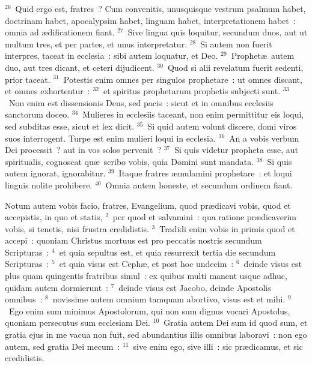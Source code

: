 ${}^{26}$~Quid ergo est, fratres~? Cum convenitis, unusquisque vestrum psalmum habet, doctrinam habet, apocalypsim habet, linguam habet, interpretationem habet~: omnia ad \ae dificationem fiant.
${}^{27}$~Sive lingua quis loquitur, secundum duos, aut ut multum tres, et per partes, et unus interpretatur.
${}^{28}$~Si autem non fuerit interpres, taceat in ecclesia~: sibi autem loquatur, et Deo.
${}^{29}$~Prophet\ae\ autem duo, aut tres dicant, et ceteri dijudicent.
${}^{30}$~Quod si alii revelatum fuerit sedenti, prior taceat.
${}^{31}$~Potestis enim omnes per singulos prophetare~: ut omnes discant, et omnes exhortentur~:
${}^{32}$~et spiritus prophetarum prophetis subjecti sunt.
${}^{33}$~Non enim est dissensionis Deus, sed pacis~: sicut et in omnibus ecclesiis sanctorum doceo.
${}^{34}$~Mulieres in ecclesiis taceant, non enim permittitur eis loqui, sed subditas esse, sicut et lex dicit.
${}^{35}$~Si quid autem volunt discere, domi viros suos interrogent. Turpe est enim mulieri loqui in ecclesia.
${}^{36}$~An a vobis verbum Dei processit~? aut in vos solos pervenit~?
${}^{37}$~Si quis videtur propheta esse, aut spiritualis, cognoscat qu\ae\ scribo vobis, quia Domini sunt mandata.
${}^{38}$~Si quis autem ignorat, ignorabitur.
${}^{39}$~Itaque fratres \ae mulamini prophetare~: et loqui linguis nolite prohibere.
${}^{40}$~Omnia autem honeste, et secundum ordinem fiant.

\lettrine[lines=10,image=true,loversize=0.05,lraise=-0.03]{N}{}otum autem vobis facio, fratres, Evangelium, quod pr\ae dicavi vobis, quod et accepistis, in quo et statis,
${}^{2}$~per quod et salvamini~: qua ratione pr\ae dicaverim vobis, si tenetis, nisi frustra credidistis.
${}^{3}$~Tradidi enim vobis in primis quod et accepi~: quoniam Christus mortuus est pro peccatis nostris secundum Scripturas~:
${}^{4}$~et quia sepultus est, et quia resurrexit tertia die secundum Scripturas~:
${}^{5}$~et quia visus est Ceph\ae , et post hoc undecim~:
${}^{6}$~deinde visus est plus quam quingentis fratribus simul~: ex quibus multi manent usque adhuc, quidam autem dormierunt~:
${}^{7}$~deinde visus est Jacobo, deinde Apostolis omnibus~:
${}^{8}$~novissime autem omnium tamquam abortivo, visus est et mihi.
${}^{9}$~Ego enim sum minimus Apostolorum, qui non sum dignus vocari Apostolus, quoniam persecutus sum ecclesiam Dei.
${}^{10}$~Gratia autem Dei sum id quod sum, et gratia ejus in me vacua non fuit, sed abundantius illis omnibus laboravi~: non ego autem, sed gratia Dei mecum~:
${}^{11}$~sive enim ego, sive illi~: sic pr\ae dicamus, et sic credidistis.


